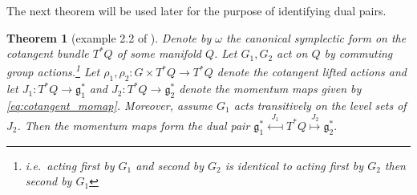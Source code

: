 \documentclass[12pt]{amsart}
\newtheorem{thm}{Theorem}[section]
\begin{document}
  The next theorem will be used later for the purpose of identifying
  dual pairs.
  
  \begin{thm}[example 2.2 of \cite{GayBalmazVizman2012}] \label{thm:commuting_actions}
    Denote by $\omega$ the canonical symplectic form on the cotangent bundle $T^*Q$ of some manifold $Q$.
    Let $G_1,G_2$ act on $Q$
    by commuting group actions.\footnote{i.e.\ acting first by $G_1$ and second by $G_2$ is identical to acting first by $G_2$ then second by $G_1$}
    Let
    $\rho_1,\rho_2: G \times T^*Q \to T^*Q$ denote the cotangent lifted actions
    and let $J_1: T^*Q \to \mathfrak{g}_1^*$ and $J_2: T^*Q \to \mathfrak{g}_2^*$ denote the momentum maps given by \eqref{eq:cotangent_momap}. 
    Moreover, assume $G_1$ acts transitively on the level sets of $J_2$.
    Then the momentum maps form the dual pair
    $
      \mathfrak{g}^*_1
      \stackrel{J_1}{\longmapsfrom}
      T^*Q
      \stackrel{J_2}{\longmapsto}
      \mathfrak{g}_2^*.
    $
  \end{thm}
\end{document}
